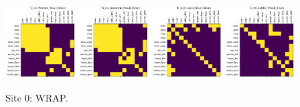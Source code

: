 \begin{figure}
    \includegraphics[width=0.24\textwidth]{chap6/figs/T1_0.0_Pearson_Result_Binary.png}
    \includegraphics[width=0.24\textwidth]{chap6/figs/T1_0.0_Spearman_Result_Binary.png}
    \includegraphics[width=0.24\textwidth]{chap6/figs/T1_0.0_Glasso_Result_Binary.png}
    \includegraphics[width=0.24\textwidth]{chap6/figs/T1_0.0_CODEC_Result_Binary.png}
    \caption{Site 0: WRAP.}
    \label{fig:site0}
\end{figure}

